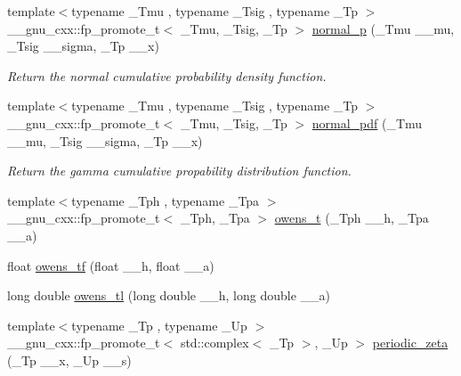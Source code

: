 \begin{DoxyCompactItemize}
\item 
{\footnotesize template$<$typename \+\_\+\+Tmu , typename \+\_\+\+Tsig , typename \+\_\+\+Tp $>$ }\\\+\_\+\+\_\+gnu\+\_\+cxx\+::fp\+\_\+promote\+\_\+t$<$ \+\_\+\+Tmu, \+\_\+\+Tsig, \+\_\+\+Tp $>$ \hyperlink{group__gnu__math__spec__func_gaeb735b0fb98c7684ba61b8940f50193c}{normal\+\_\+p} (\+\_\+\+Tmu \+\_\+\+\_\+mu, \+\_\+\+Tsig \+\_\+\+\_\+sigma, \+\_\+\+Tp \+\_\+\+\_\+x)
\begin{DoxyCompactList}\small\item\em Return the normal cumulative probability density function. \end{DoxyCompactList}\item 
{\footnotesize template$<$typename \+\_\+\+Tmu , typename \+\_\+\+Tsig , typename \+\_\+\+Tp $>$ }\\\+\_\+\+\_\+gnu\+\_\+cxx\+::fp\+\_\+promote\+\_\+t$<$ \+\_\+\+Tmu, \+\_\+\+Tsig, \+\_\+\+Tp $>$ \hyperlink{group__gnu__math__spec__func_gab795379781dea732cbc7556351760401}{normal\+\_\+pdf} (\+\_\+\+Tmu \+\_\+\+\_\+mu, \+\_\+\+Tsig \+\_\+\+\_\+sigma, \+\_\+\+Tp \+\_\+\+\_\+x)
\begin{DoxyCompactList}\small\item\em Return the gamma cumulative propability distribution function. \end{DoxyCompactList}\item 
{\footnotesize template$<$typename \+\_\+\+Tph , typename \+\_\+\+Tpa $>$ }\\\+\_\+\+\_\+gnu\+\_\+cxx\+::fp\+\_\+promote\+\_\+t$<$ \+\_\+\+Tph, \+\_\+\+Tpa $>$ \hyperlink{group__gnu__math__spec__func_gab4e367aae19853cca3af99eead01fcaa}{owens\+\_\+t} (\+\_\+\+Tph \+\_\+\+\_\+h, \+\_\+\+Tpa \+\_\+\+\_\+a)
\item 
float \hyperlink{group__gnu__math__spec__func_gac24d32e9b072c4953654d5559f992871}{owens\+\_\+tf} (float \+\_\+\+\_\+h, float \+\_\+\+\_\+a)
\item 
long double \hyperlink{group__gnu__math__spec__func_ga7a8bc60dc0ef4a009586872eb7cac2d0}{owens\+\_\+tl} (long double \+\_\+\+\_\+h, long double \+\_\+\+\_\+a)
\item 
{\footnotesize template$<$typename \+\_\+\+Tp , typename \+\_\+\+Up $>$ }\\\+\_\+\+\_\+gnu\+\_\+cxx\+::fp\+\_\+promote\+\_\+t$<$ std\+::complex$<$ \+\_\+\+Tp $>$, \+\_\+\+Up $>$ \hyperlink{group__gnu__math__spec__func_ga06b06216e87b868cb21c76d33ac560c8}{periodic\+\_\+zeta} (\+\_\+\+Tp \+\_\+\+\_\+x, \+\_\+\+Up \+\_\+\+\_\+s)

\end{DoxyCompactItemize}
